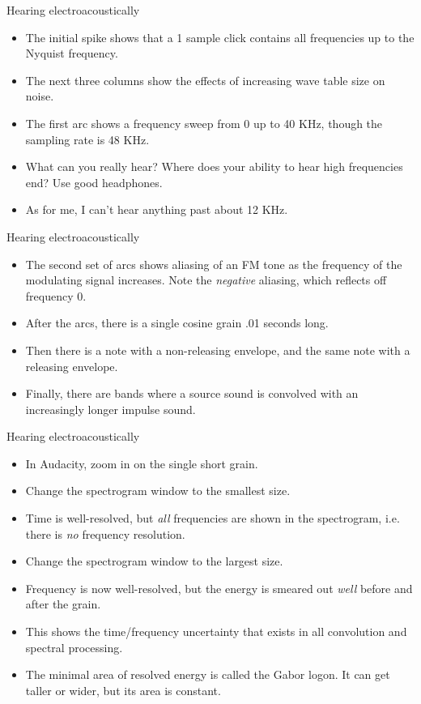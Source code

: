 \documentclass{beamer}
\begin{document}
\begin{frame}{Hearing electroacoustically}
\begin{itemize}
\item The initial spike shows that a 1 sample click contains all frequencies up to the Nyquist frequency.
\item The next three columns show the effects of increasing wave table size on noise.
\item The first arc shows a frequency sweep from 0 up to 40 KHz, though the sampling rate is 48 KHz.
\item What can you really hear? Where does your ability to hear high frequencies end? Use good headphones.
\item As for me, I can't hear anything past about 12 KHz.
\end{itemize}
\end{frame}

\begin{frame}{Hearing electroacoustically}
\begin{itemize}
\item The second set of arcs shows aliasing of an FM tone as the frequency of the modulating signal increases. 
Note the \emph{negative} aliasing, which reflects off frequency 0.
\item After the arcs, there is a single cosine grain .01 seconds long.
\item Then there is a note with a non-releasing envelope, and the same note with a releasing envelope.
\item Finally, there are bands where a source sound is convolved with an increasingly longer impulse sound.
\end{itemize}
\end{frame}

\begin{frame}{Hearing electroacoustically}
\begin{itemize}
\item In Audacity, zoom in on the single short grain.
\item Change the spectrogram window to the smallest size.
\item Time is well-resolved, but \emph{all} frequencies are shown in the spectrogram, i.e. there is \emph{no} frequency resolution.
\item Change the spectrogram window to the largest size.
\item Frequency is now well-resolved, but the energy is smeared out \emph{well} before and after the grain.
\item This shows the time/frequency uncertainty that exists in all convolution and spectral processing.
\item The minimal area of resolved energy is called the Gabor logon. It can get taller or wider, but its area is constant.
\end{itemize}
\end{frame}
\end{document}

